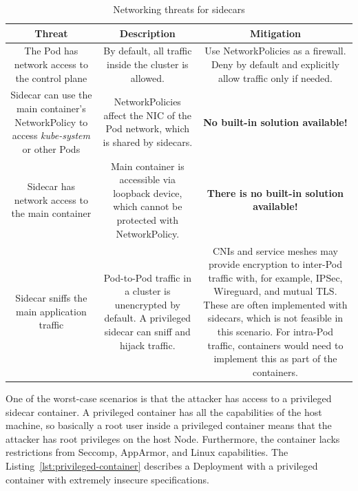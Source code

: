 \documentclass[english, 12pt, a4paper, sci, utf8, a-2b, online]{aaltothesis}
\begin{document}
\begin{table}[H]
  \sffamily
  \centering

  \caption{Networking threats for sidecars}
  \label{table:threat-model-network}

  \begin{minipage}{\textwidth}
  \renewcommand{\thempfootnote}{\arabic{mpfootnote}}
  \begin{tabularx}{\textwidth}{CCC}
    \hline
    \textbf{Threat} & \textbf{Description} & \textbf{Mitigation} \\ \hline
    The Pod has network access to the control plane & By default, all traffic inside the cluster is allowed. & Use NetworkPolicies as a firewall. Deny by default and explicitly allow traffic only if needed. \\ \hline
    Sidecar can use the main container's NetworkPolicy to access \emph{kube-system} or other Pods & NetworkPolicies affect the NIC of the Pod network, which is shared by sidecars. & \textbf{No built-in solution available!} \\ \hline
    Sidecar has network access to the main container & Main container is accessible via loopback device, which cannot be protected with NetworkPolicy. & \textbf{There is no built-in solution available!} \\ \hline
    Sidecar sniffs the main application traffic & Pod-to-Pod traffic in a cluster is unencrypted by default. A privileged sidecar can sniff and hijack traffic. & CNIs and service meshes may provide encryption to inter-Pod traffic with, for example, IPSec, Wireguard, and mutual TLS. These are often implemented with sidecars, which is not feasible in this scenario. For intra-Pod traffic, containers would need to implement this as part of the containers. \\ \hline
  \end{tabularx}
\end{minipage}
\end{table}

One of the worst-case scenarios is that the attacker has access to a privileged sidecar container.
A privileged container has all the capabilities of the host machine, so basically a root user inside a privileged container means that the attacker has root privileges on the host Node.
Furthermore, the container lacks restrictions from Seccomp, AppArmor, and Linux capabilities.
The Listing~\ref{lst:privileged-container} describes a Deployment with a privileged container with extremely insecure specifications.
\end{document}
